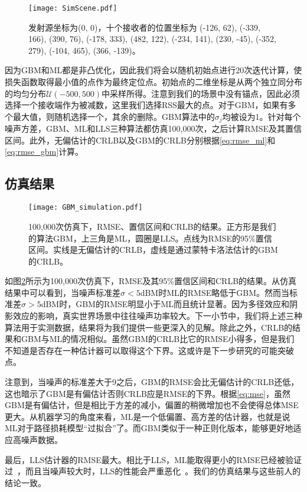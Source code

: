 \begin{figure}[tb]
	\centering
	\texttt{[image: SimScene.pdf]}
	\caption{发射源坐标为(0, 0)，十个接收者的位置坐标为 (-126, 62), (-339, 166), (390, 76), (-178, 333), (482, 122), (-234, 141), (230, -45), (-352, 279), (-104, 465), (366, -139)。}
	\label{fig:simscene}
\end{figure}

因为GBM和ML都是非凸优化，因此我们将会以随机初始点进行20次迭代计算，使损失函数取得最小值的点作为最终定位点。初始点的二维坐标是从两个独立同分布的均匀分布$\mathcal{U}(-500, 500)$中采样所得。注意到我们的场景中没有锚点，因此必须选择一个接收端作为被减数，这里我们选择RSS最大的点。对于GBM，如果有多个最大值，则随机选择一个，其余的删除。GBM算法中的$\sigma_j$均被设为1。针对每个噪声方差，GBM、ML和LLS三种算法都仿真100,000次，之后计算RMSE及其置信区间。此外，无偏估计的CRLB以及GBM的CRLB分别根据\eqref{eq:rmse_ml}和\eqref{eq:rmse_gbm}计算。

\subsection{仿真结果}

\begin{figure}[tb]
	\centering
	\texttt{[image: GBM\_simulation.pdf]}
	\caption{100,000次仿真下，RMSE、置信区间和CRLB的结果。正方形是我们的算法GBM，上三角是ML，圆圈是LLS。点线为RMSE的95\%置信区间。实线是无偏估计的CRLB，虚线是通过蒙特卡洛法估计的GBM的CRLB。}
	\label{fig:gbm_sim}
\end{figure}

如图\ref{fig:gbm_sim}所示为100,000次仿真下，RMSE及其95\%置信区间和CRLB的结果。从仿真结果中可以看到，当噪声标准差$\sigma<5$dBM时ML的RMSE略低于GBM。然而当标准差$\sigma>5$dBM时，GBM的RMSE明显小于ML而且统计显著。因为多径效应和阴影效应的影响，真实世界场景中往往噪声功率较大。下一小节中，我们将上述三种算法用于实测数据，结果将为我们提供一些更深入的见解。除此之外，CRLB的结果和GBM与ML的情况相似。虽然GBM的CRLB比它的RMSE小得多，但是我们不知道是否存在一种估计器可以取得这个下界。这或许是下一步研究的可能突破点。

注意到，当噪声的标准差大于9之后，GBM的RMSE会比无偏估计的CRLB还低，这也暗示了GBM是有偏估计否则CRLB应是RMSE的下界。根据\eqref{eq:mse}，虽然GBM是有偏估计，但是相比于方差的减小，偏置的稍微增加也不会使得总体MSE更大。从机器学习的角度来看，ML是一个低偏置、高方差的估计器，也就是说ML对于路径损耗模型“过拟合”了。而GBM类似于一种正则化版本，能够更好地适应高噪声数据。

最后，LLS估计器的RMSE最大。相比于LLS，ML能取得更小的RMSE已经被验证过~\cite{jackson2011received}，而且当噪声较大时，LLS的性能会严重恶化~\cite{vaghefi2013cooperative}。我们的仿真结果与这些前人的结论一致。

